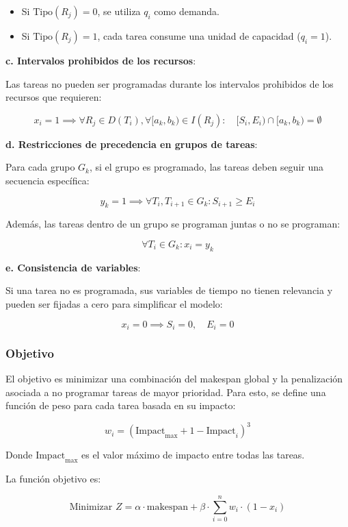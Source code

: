 \documentclass{article}
\begin{document}
\begin{itemize}
    \item Si \( \text{Tipo}(R_j) = 0 \), se utiliza \( q_i \) como demanda.
    \item Si \( \text{Tipo}(R_j) = 1 \), cada tarea consume una unidad de capacidad (\( q_i = 1 \)).
\end{itemize}

\textbf{c. Intervalos prohibidos de los recursos}:

Las tareas no pueden ser programadas durante los intervalos prohibidos de los recursos que requieren:

\[
x_i = 1 \implies \forall R_j \in D(T_i), \forall [a_k, b_k) \in I(R_j): \quad [S_i, E_i) \cap [a_k, b_k) = \emptyset
\]

\textbf{d. Restricciones de precedencia en grupos de tareas}:

Para cada grupo \( G_k \), si el grupo es programado, las tareas deben seguir una secuencia específica:

\[
y_k = 1 \implies \forall T_i, T_{i+1} \in G_k: S_{i+1} \geq E_i
\]

Además, las tareas dentro de un grupo se programan juntas o no se programan:

\[
\forall T_i \in G_k: x_i = y_k
\]

\textbf{e. Consistencia de variables}:

Si una tarea no es programada, sus variables de tiempo no tienen relevancia y pueden ser fijadas a cero para simplificar el modelo:

\[
x_i = 0 \implies S_i = 0, \quad E_i = 0
\]

\vspace{0.5cm}

\subsubsection{Objetivo}

El objetivo es minimizar una combinación del makespan global y la penalización asociada a no programar tareas de mayor prioridad. Para esto, se define una función de peso para cada tarea basada en su impacto:

\[
w_i = (\text{Impact}_{\text{max}} + 1 - \text{Impact}_i)^3
\]

Donde \( \text{Impact}_{\text{max}} \) es el valor máximo de impacto entre todas las tareas.

La función objetivo es:

\[
\text{Minimizar } Z = \alpha \cdot \text{makespan} + \beta \cdot \sum_{i=0}^{n} w_i \cdot (1 - x_i)
\]
\end{document}
